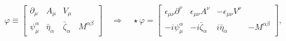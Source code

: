 \begin{equation}
\label{2.2}
\varphi \equiv \begin{bmatrix}
\partial_\mu & A_\mu & V_\mu &
\\
\psi_\mu^\alpha & \bar{\eta}_\alpha & \bar{\zeta}_\alpha & M^{\alpha\beta}
\end{bmatrix}
\quad \Rightarrow \quad
\star \varphi = \begin{bmatrix}
\epsilon_{\mu\nu} \partial^\nu & \epsilon_{\mu\nu} A^\nu &
- \epsilon_{\mu\nu} V^\nu &
\\
- i \psi_\mu^\alpha & - i \bar{\zeta}_\alpha & i \bar{\eta}_\alpha &
- M^{\alpha\beta}
\end{bmatrix},
\end{equation}

